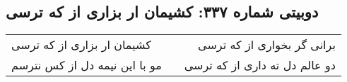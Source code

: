 \begin{center}
\section*{دوبیتی شماره ۳۳۷: کشیمان ار بزاری از که ترسی}
\label{sec:337}
\begin{longtable}{l p{0.5cm} r}
کشیمان ار بزاری از که ترسی
&&
برانی گر بخواری از که ترسی
\\
مو با این نیمه دل از کس نترسم
&&
دو عالم دل ته داری از که ترسی
\\
\end{longtable}
\end{center}
